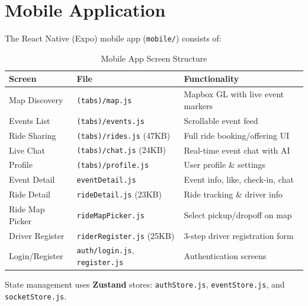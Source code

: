 \section{Mobile Application}
The React Native (Expo) mobile app (\texttt{mobile/}) consists of:

\begin{table}[H]
\centering
\caption{Mobile App Screen Structure}
\label{tab:mobile_screens}
\begin{tabular}{@{}llp{6cm}@{}}
\toprule
\textbf{Screen} & \textbf{File} & \textbf{Functionality} \\
\midrule
Map Discovery & \texttt{(tabs)/map.js} & Mapbox GL with live event markers \\
Events List & \texttt{(tabs)/events.js} & Scrollable event feed \\
Ride Sharing & \texttt{(tabs)/rides.js} (47KB) & Full ride booking/offering UI \\
Live Chat & \texttt{(tabs)/chat.js} (24KB) & Real-time event chat with AI \\
Profile & \texttt{(tabs)/profile.js} & User profile \& settings \\
Event Detail & \texttt{eventDetail.js} & Event info, like, check-in, chat \\
Ride Detail & \texttt{rideDetail.js} (23KB) & Ride tracking \& driver info \\
Ride Map Picker & \texttt{rideMapPicker.js} & Select pickup/dropoff on map \\
Driver Register & \texttt{riderRegister.js} (25KB) & 3-step driver registration form \\
Login/Register & \texttt{auth/login.js}, \texttt{register.js} & Authentication screens \\
\bottomrule
\end{tabular}
\end{table}

State management uses \textbf{Zustand} stores: \texttt{authStore.js}, \texttt{eventStore.js}, and 
\\ \texttt{socketStore.js}.

